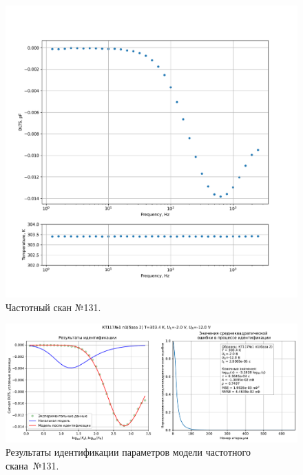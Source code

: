 \begin{figure}[!ht]
    \centering
    \includegraphics[width=1\textwidth]{../plots/КТ117№1_п1(база 2)_2500Гц-1Гц_1пФ_+30С_-2В-12В_200мВ_20мкс_шаг_0,1.pdf}
    \caption{Частотный скан №131.}
    \label{pic:frequency_scan_131}
\end{figure}

\begin{figure}[!ht]
    \centering
    \includegraphics[width=1\textwidth]{../plots/КТ117№1_п1(база 2)_2500Гц-1Гц_1пФ_+30С_-2В-12В_200мВ_20мкс_шаг_0,1_model.pdf}
    \caption{Результаты идентификации параметров модели частотного скана~№131.}
    \label{pic:frequency_scan_model131}
\end{figure}

\pagebreak



